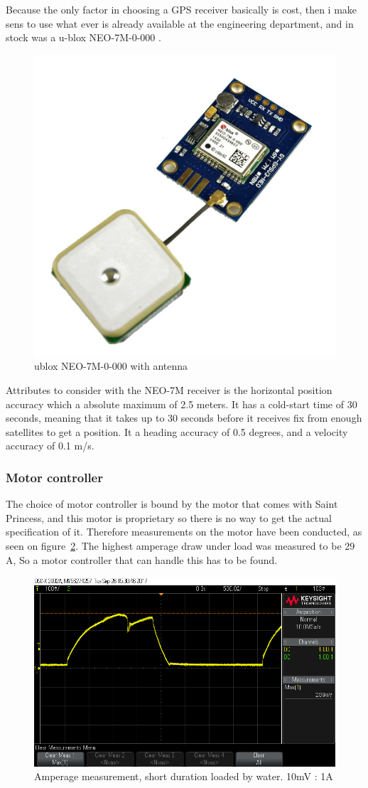 Because the only factor in choosing a GPS receiver basically is cost, then i make sens to use what ever is already available at the engineering department, and in stock was a u-blox NEO-7M-0-000 \cite{ublox-datasheet}. 
\begin{figure}[H]
\centering
\includegraphics[width=0.5\linewidth]{Images/Design/ublox}
\caption{ublox NEO-7M-0-000 with antenna\cite{ublox-image}}
\label{fig:ublox}
\end{figure}
Attributes to consider with the NEO-7M receiver is the horizontal position accuracy which a absolute maximum of 2.5 meters. It has a cold-start time of 30 seconds, meaning that it takes up to 30 seconds before it receives fix from enough satellites to get a position. It a heading accuracy of 0.5 degrees, and a velocity accuracy of 0.1 m/s. 

\subsubsection{Motor controller}
The choice of motor controller is bound by the motor that comes with Saint Princess, and this motor is proprietary so there is no way to get the actual specification of it. Therefore measurements on the motor have been conducted, as seen on figure~\ref{fig:motoramperagetest}. The highest amperage draw under load was measured to be 29 A, So a motor controller that can handle this has to be found.

\begin{figure}[H]
\centering
\includegraphics[width=0.7\linewidth]{Images/Design/motor_amperage_test}
\caption{Amperage measurement, short duration loaded by water. 10mV : 1A}
\label{fig:motoramperagetest}
\end{figure}

